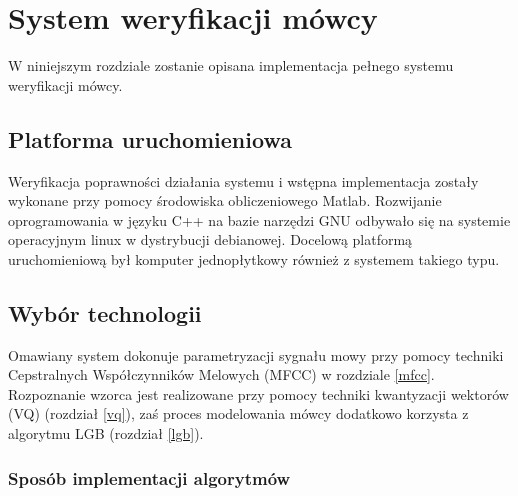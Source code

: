 \chapter{System weryfikacji mówcy}

W niniejszym rozdziale zostanie opisana implementacja pełnego systemu weryfikacji mówcy. 

\section{Platforma uruchomieniowa}

Weryfikacja poprawności działania systemu i wstępna implementacja zostały wykonane przy pomocy środowiska obliczeniowego Matlab. Rozwijanie oprogramowania w języku C++ na bazie narzędzi GNU odbywało się na systemie operacyjnym linux w dystrybucji debianowej. Docelową platformą uruchomieniową był komputer jednopłytkowy również z systemem takiego typu.

\section{Wybór technologii}

Omawiany system dokonuje parametryzacji sygnału mowy przy pomocy techniki Cepstralnych Współczynników Melowych (MFCC) w rozdziale {\ref{mfcc}}. Rozpoznanie wzorca jest realizowane przy pomocy techniki kwantyzacji wektorów (VQ) (rozdział \ref{vq}), zaś proces modelowania mówcy dodatkowo korzysta z algorytmu LGB (rozdział \ref{lgb}).

\subsection{Sposób implementacji algorytmów}

